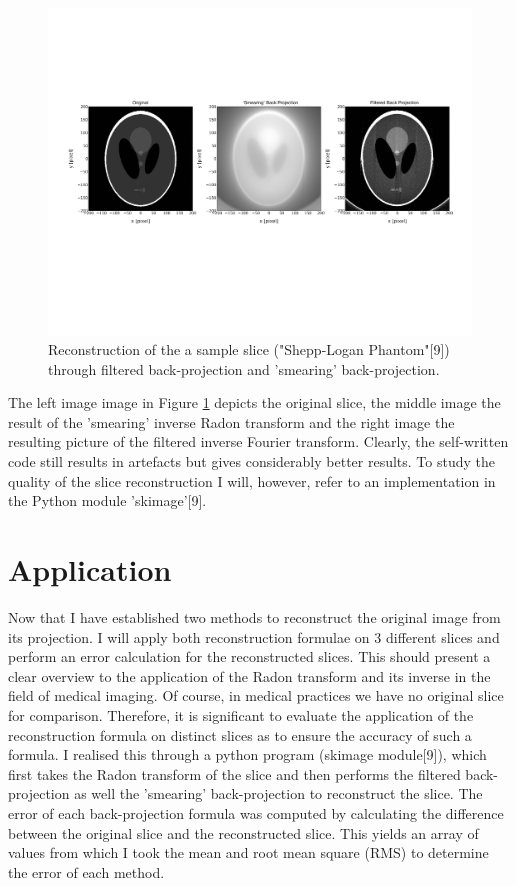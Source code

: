 \documentclass[12pt]{article}
\begin{document}
\begin{figure}[hbt]
	\includegraphics[width = 1\textwidth]{filtered/filtered_radon_transform.pdf}
	\caption{Reconstruction of the a sample slice ("Shepp-Logan Phantom"[9]) through filtered back-projection and 'smearing' back-projection.}\label{fig:inverse_filtered_radon_transform}
\end{figure}

The left image image in Figure \ref{fig:inverse_filtered_radon_transform} depicts the original slice, the middle image the result of the 'smearing' inverse Radon transform and the right image the resulting picture of the filtered inverse Fourier transform. Clearly, the self-written code still results in artefacts but gives considerably better results. To study the quality of the slice reconstruction  I will, however, refer to an implementation in the Python module 'skimage'[9].
\section{Application}
Now that I have established two methods to reconstruct the original image from its projection. I will apply both reconstruction formulae on 3 different slices and perform an error calculation for the reconstructed slices. This should present a clear overview to the application of the Radon transform and its inverse in the field of medical imaging. Of course, in medical practices we have no original slice for comparison. Therefore, it is significant to evaluate the application of the reconstruction formula on  distinct slices as to ensure the accuracy of such a formula. I realised this through a python program (skimage module[9]), which first takes the Radon transform of the slice and then performs the filtered back-projection as well the 'smearing' back-projection to reconstruct the slice. The error of each back-projection formula was computed by calculating the difference between the original slice and the reconstructed slice. This yields an array of values from which I took the mean and root mean square (RMS) to determine the error of each method.
\end{document}
